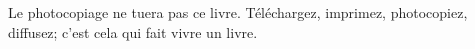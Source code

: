 

\begin{center}
Le photocopiage ne tuera pas ce livre. Téléchargez, imprimez, photocopiez, diffusez; c'est cela qui fait vivre un livre.
\end{center}


